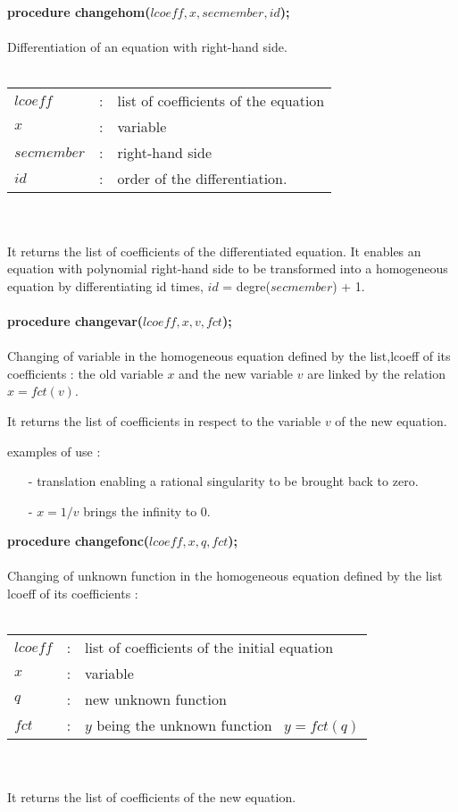 {\bf procedure changehom($lcoeff,x,secmember,id$);} \\
\ \\
Differentiation of an equation with right-hand side. \\
\ \\
\begin{tabular}{lcl}
$lcoeff$ & : & list of coefficients of the equation \\
$x$ & : & variable \\
$secmember$ & : & right-hand side \\
$id$ & : & order of the differentiation. \\
\end{tabular} \\
\ \\
It returns the list of coefficients of the differentiated equation.
It enables an equation with polynomial right-hand side to be transformed
into a homogeneous equation by differentiating id times,
$id$ = degre($secmember$) + 1. \\
\ \\
{\bf procedure changevar($lcoeff,x,v,fct$);} \\
\ \\
Changing of variable in the homogeneous equation defined by the list,lcoeff
of its coefficients : the old variable $x$ and the new variable $v$ are linked
by the relation $x = fct(v)$. \par

It returns the list of coefficients in respect to the variable $v$ of the new
equation. \par

examples of use : \par

\begin{itemize}
\item[-] translation enabling a rational singularity to be brought back to zero.
\item[-] $x = 1/v$ brings the infinity to 0.
\end{itemize}

{\bf procedure changefonc($lcoeff,x,q,fct$);} \\
\ \\
Changing of unknown function in the homogeneous equation defined by the
list lcoeff of its coefficients : \\
\ \\
\begin{tabular}{lcl}
$lcoeff$ & : & list of coefficients of the initial equation \\
$x$      & : & variable \\
$q$ & : & new unknown function \\
$fct$ & : & $y$ being the unknown function~ $y = fct(q)$ \\
\end{tabular} \\
\ \\
It returns the list of coefficients of the new equation. \par

